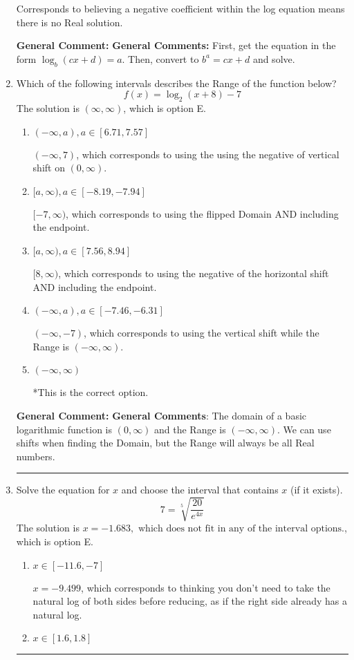 \documentclass{extbook}[14pt]
\newcommand{\litem}[1]{\item #1

\rule{\textwidth}{0.4pt}}
\begin{document}
\begin{enumerate}
{\begin{enumerate}[label=\Alph*.]
Corresponds to believing a negative coefficient within the log equation means there is no Real solution.
\end{enumerate}

\textbf{General Comment:} \textbf{General Comments:} First, get the equation in the form $\log_b{(cx+d)} = a$. Then, convert to $b^a = cx+d$ and solve.
}
\litem{
Which of the following intervals describes the Range of the function below?
\[ f(x) = \log_2{(x+8)}-7 \]The solution is \( (\infty, \infty) \), which is option E.\begin{enumerate}[label=\Alph*.]
\item \( (-\infty, a), a \in [6.71, 7.57] \)

$(-\infty, 7)$, which corresponds to using the using the negative of vertical shift on $(0, \infty)$.
\item \( [a, \infty), a \in [-8.19, -7.94] \)

$[-7, \infty)$, which corresponds to using the flipped Domain AND including the endpoint.
\item \( [a, \infty), a \in [7.56, 8.94] \)

$[8, \infty)$, which corresponds to using the negative of the horizontal shift AND including the endpoint.
\item \( (-\infty, a), a \in [-7.46, -6.31] \)

$(-\infty, -7)$, which corresponds to using the vertical shift while the Range is $(-\infty, \infty)$.
\item \( (-\infty, \infty) \)

*This is the correct option.
\end{enumerate}

\textbf{General Comment:} \textbf{General Comments}: The domain of a basic logarithmic function is $(0, \infty)$ and the Range is $(-\infty, \infty)$. We can use shifts when finding the Domain, but the Range will always be all Real numbers.
}
\litem{
 Solve the equation for $x$ and choose the interval that contains $x$ (if it exists).
\[  7 = \sqrt[5]{\frac{20}{e^{4x}}} \]The solution is \( x = -1.683, \text{ which does not fit in any of the interval options.} \), which is option E.\begin{enumerate}[label=\Alph*.]
\item \( x \in [-11.6, -7] \)

$x = -9.499$, which corresponds to thinking you don't need to take the natural log of both sides before reducing, as if the right side already has a natural log.
\item \( x \in [1.6, 1.8] \)


\end{enumerate}}
\end{enumerate}
\end{document}
